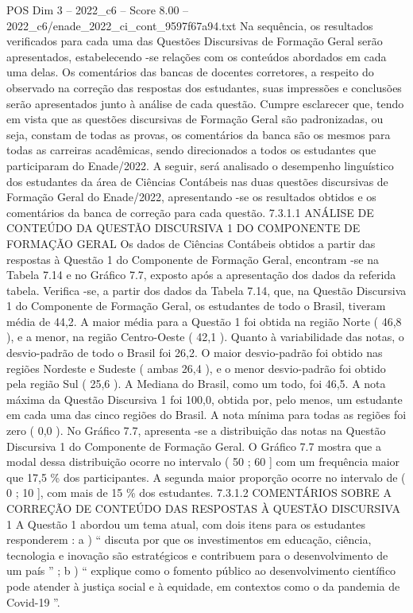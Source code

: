 \begin{textsample}{POS Dim 3 – 2022\_c6 – Score 8.00 – 2022\_c6/enade\_2022\_ci\_cont\_9597f67a94.txt}
Na sequência, os resultados verificados para cada uma das Questões Discursivas de Formação Geral serão apresentados, estabelecendo -se relações com os conteúdos abordados em cada uma delas.
Os comentários das bancas de docentes corretores, a respeito do observado na correção das respostas dos estudantes, suas impressões e conclusões serão apresentados junto à análise de cada questão.
Cumpre esclarecer que, tendo em vista que as questões discursivas de Formação Geral são padronizadas, ou seja, constam de todas as provas, os comentários da banca são os mesmos para todas as carreiras acadêmicas, sendo direcionados a todos os estudantes que participaram do Enade/2022.
A seguir, será analisado o desempenho linguístico dos estudantes da área de Ciências Contábeis nas duas questões discursivas de Formação Geral do Enade/2022, apresentando -se os resultados obtidos e os comentários da banca de correção para cada questão. 7.3.1.1 ANÁLISE DE CONTEÚDO DA QUESTÃO DISCURSIVA 1 DO COMPONENTE DE FORMAÇÃO GERAL Os dados de Ciências Contábeis obtidos a partir das respostas à Questão 1 do Componente de Formação Geral, encontram -se na Tabela 7.14 e no Gráfico 7.7, exposto após a apresentação dos dados da referida tabela.
Verifica -se, a partir dos dados da Tabela 7.14, que, na Questão Discursiva 1 do Componente de Formação Geral, os estudantes de todo o Brasil, tiveram média de 44,2.
A maior média para a Questão 1 foi obtida na região Norte ( 46,8 ), e a menor, na região Centro-Oeste ( 42,1 ).
Quanto à variabilidade das notas, o desvio-padrão de todo o Brasil foi 26,2.
O maior desvio-padrão foi obtido nas regiões Nordeste e Sudeste ( ambas 26,4 ), e o menor desvio-padrão foi obtido pela região Sul ( 25,6 ).
A Mediana do Brasil, como um todo, foi 46,5.
A nota máxima da Questão Discursiva 1 foi 100,0, obtida por, pelo menos, um estudante em cada uma das cinco regiões do Brasil.
A nota mínima para todas as regiões foi zero ( 0,0 ).
No Gráfico 7.7, apresenta -se a distribuição das notas na Questão Discursiva 1 do Componente de Formação Geral.
O Gráfico 7.7 mostra que a modal dessa distribuição ocorre no intervalo ( 50 ; 60 ] com um frequência maior que 17,5 \% dos participantes.
A segunda maior proporção ocorre no intervalo de ( 0 ; 10 ], com mais de 15 \% dos estudantes. 7.3.1.2 COMENTÁRIOS SOBRE A CORREÇÃO DE CONTEÚDO DAS RESPOSTAS À QUESTÃO DISCURSIVA 1 A Questão 1 abordou um tema atual, com dois itens para os estudantes responderem : a ) “ discuta por que os investimentos em educação, ciência, tecnologia e inovação são estratégicos e contribuem para o desenvolvimento de um país ” ; b ) “ explique como o fomento público ao desenvolvimento científico pode atender à justiça social e à equidade, em contextos como o da pandemia de Covid-19 ”.

\end{textsample}
